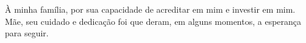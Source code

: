 À minha família, por sua capacidade de acreditar em mim e investir em mim. Mãe, seu cuidado e dedicação foi que deram, em alguns momentos, a esperança para seguir.